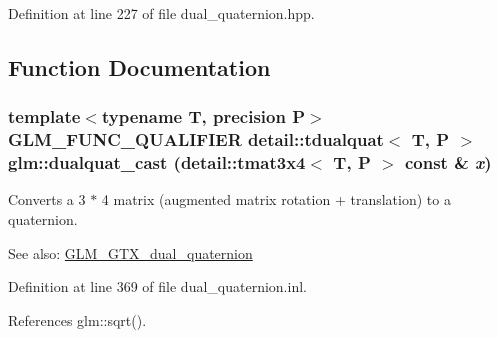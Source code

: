 Definition at line 227 of file dual\_\-quaternion.hpp.

\subsection{Function Documentation}
\hypertarget{group__gtc__dual__quaternion_ge10828b8a3ab80fa7e9e429ebaefb9e0}{
\subsubsection[dualquat\_\-cast]{\setlength{\rightskip}{0pt plus 5cm}template$<$typename T, precision P$>$ GLM\_\-FUNC\_\-QUALIFIER detail::tdualquat$<$ T, P $>$ glm::dualquat\_\-cast (detail::tmat3x4$<$ T, P $>$ const \& {\em x})}}
\label{group__gtc__dual__quaternion_ge10828b8a3ab80fa7e9e429ebaefb9e0}


Converts a 3 $\ast$ 4 matrix (augmented matrix rotation + translation) to a quaternion.

\begin{Desc}
\item[See also:]\hyperlink{group__gtc__dual__quaternion}{GLM\_\-GTX\_\-dual\_\-quaternion} \end{Desc}


Definition at line 369 of file dual\_\-quaternion.inl.

References glm::sqrt().

